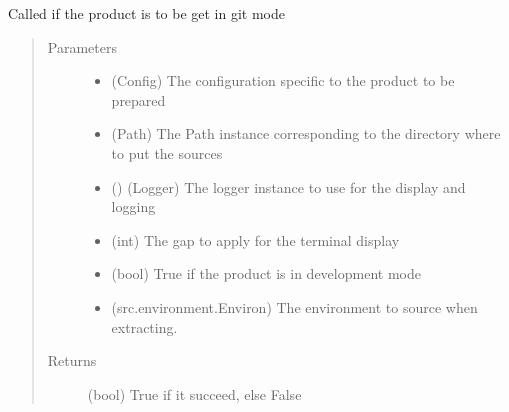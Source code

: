 \documentclass[a4paper,10pt,english]{sphinxmanual}
\begin{document}

\begin{fulllineitems}
\label{\detokenize{apidoc_commands/commands:commands.source.get_source_from_dir}}
\end{fulllineitems}


\begin{fulllineitems}
\label{\detokenize{apidoc_commands/commands:commands.source.get_source_from_git}}
Called if the product is to be get in git mode
\begin{quote}\begin{description}
\item[{Parameters}] \leavevmode\begin{itemize}
\item {} 
 \textendash{} (Config) 
The configuration specific to the product to be prepared

\item {} 
 \textendash{} (Path)
The Path instance corresponding to the
directory where to put the sources

\item {} 
 () \textendash{} (Logger) 
The logger instance to use for the display and logging

\item {} 
 \textendash{} (int) The gap to apply for the terminal display

\item {} 
 \textendash{} (bool) True if the product is in development mode

\item {} 
 \textendash{} (src.environment.Environ)
The environment to source when extracting.

\end{itemize}

\item[{Returns}] \leavevmode
(bool) True if it succeed, else False

\end{description}\end{quote}

\end{fulllineitems}
\end{document}
